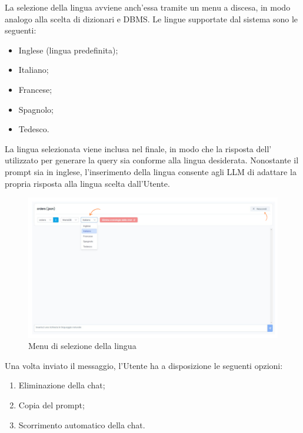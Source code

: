  \label{sec:lingua-chat}

\par La selezione della lingua avviene anch'essa tramite un menu a discesa, in modo analogo alla scelta di dizionari e DBMS. Le lingue supportate dal sistema sono le seguenti:
\begin{itemize}
  \item Inglese (lingua predefinita);
  \item Italiano;
  \item Francese;
  \item Spagnolo;
  \item Tedesco.
\end{itemize}

\vspace{0.5\baselineskip}
\par La lingua selezionata viene inclusa nel  finale, in modo che la risposta dell' utilizzato per generare la query  sia conforme alla lingua desiderata. Nonostante il prompt sia in inglese, l'inserimento della lingua consente agli LLM di adattare la propria risposta alla lingua scelta dall'Utente.

\begin{figure}[H]
  \centering
  \includegraphics[width=1\textwidth]{assets/cambio_lingua.png}
  \caption{Menu di selezione della lingua}
\end{figure}

\par Una volta inviato il messaggio, l'Utente ha a disposizione le seguenti opzioni:
\begin{enumerate}
  \item Eliminazione della chat;
  \item Copia del prompt;
  \item Scorrimento automatico della chat.
\end{enumerate}

